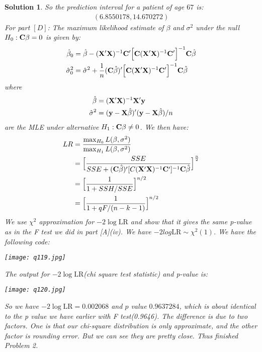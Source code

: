 \documentclass[11pt]{article}
\newtheorem{sol}{Solution}
\begin{document}
\begin{sol}
	So the prediction interval for a patient of age $67$ is:
	\begin{align*}
		(6.8550178, 14.670272)
	\end{align*}
	For part $[D]$:\vskip 2mm
	The maximum likelihood estimate of $\beta $ and $\sigma^2$ under the null $H_0: {\bf C}\beta = 0$ is given by:
	\begin{align*}
		\hat{\beta}_0 &= \hat{\beta} - ({\bf X}'{\bf X})^{-1}{\bf C}'\Big[{\bf C}({\bf X}'{\bf X})^{-1}{\bf C}'\Big]^{-1}{\bf C}\hat{\beta}\\
		\hat{\sigma}^2_0 &= \hat{\sigma}^2 + \frac{1}{n}({\bf C}\hat{\beta})'\Big[{\bf C}({\bf X}'{\bf X})^{-1}{\bf C}'\Big]^{-1}{\bf C}\hat{\beta}
	\end{align*}
	where 
	\begin{align*}
		\hat{\beta} &= ({\bf X}'{\bf X})^{-1}{\bf X}'{\bf y}\\
		\hat{\sigma}^2 &= ({\bf y} - {\bf X}\hat{\beta})'({\bf y} - {\bf X}\hat{\beta})/n
	\end{align*}
	are the MLE under alternative $H_1: {\bf C}\beta \neq 0$.
	We then have:
	\begin{align*}
		LR &= \frac{\max_{H_0}L(\beta, \sigma^2)}{\max_{H_1}L(\beta, \sigma^2)}\\
		&= \Big[\frac{SSE}{SSE + ({\bf C}\hat{\beta})'[C({\bf X}'{\bf X})^{-1}{\bf C}']^{-1}{\bf C}\hat{\beta}}\Big]^{\frac{n}{2}}\\
		&= \Big[\frac{1}{1 + SSH/SSE}\Big]^{n/2}\\
		&= \Big[\frac{1}{1 + qF/(n - k - 1)}\Big]^{n/2}
	\end{align*}
	We use $\chi^2$ approximation for $-2\log \text{LR}$ and show that it gives the same p-value as in the F test we did in part [A](iv).\vskip 2mm
	We have $-2log \text{LR} \sim \chi^2(1)$. We have the following code:
	\begin{center}
		\texttt{[image: q119.jpg]}
	\end{center}
	The output for $-2\log \text{LR}$(chi square test statistic) and p-value is:
	\begin{center}
		\texttt{[image: q120.jpg]}
	\end{center}
	So we have $-2\log \text{LR} = 0.002068$ and $p$ value $0.9637284$, which is about identical to the p value we have earlier with F test(0.9646). The difference is due to two factors. One is that our chi-square distribution is only approximate, and the other factor is rounding error. But we can see they are pretty close.\vskip 2mm
	Thus finished Problem 2.
\end{sol} 
\end{document}
